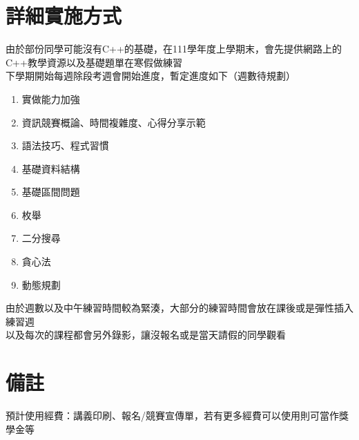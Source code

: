 \documentclass[12pt]{article}
\begin{document}
    \section{詳細實施方式}
    由於部份同學可能沒有C++的基礎，在111學年度上學期末，會先提供網路上的C++教學資源以及基礎題單在寒假做練習\\
    \noindent
    下學期開始每週除段考週會開始進度，暫定進度如下（週數待規劃）
    \begin{enumerate}
        \item 實做能力加強
        \item 資訊競賽概論、時間複雜度、心得分享示範
        \item 語法技巧、程式習慣
        \item 基礎資料結構
        \item 基礎區間問題
        \item 枚舉
        \item 二分搜尋
        \item 貪心法
        \item 動態規劃
    \end{enumerate}

    \noindent
    由於週數以及中午練習時間較為緊湊，大部分的練習時間會放在課後或是彈性插入練習週\\
    以及每次的課程都會另外錄影，讓沒報名或是當天請假的同學觀看

    \section{備註}
    預計使用經費：講義印刷、報名/競賽宣傳單，若有更多經費可以使用則可當作獎學金等
\end{document}

